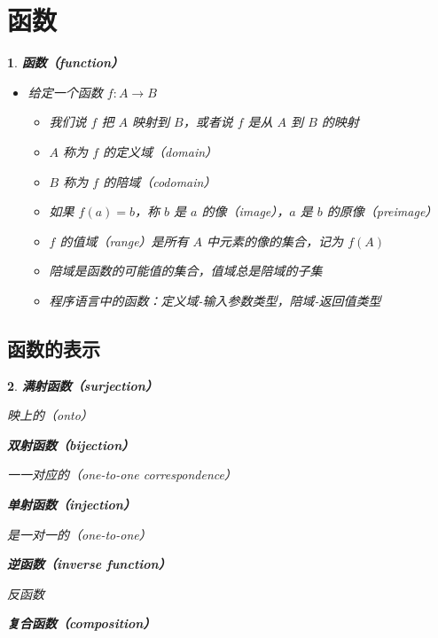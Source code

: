 \documentclass[UTF8]{report}
\theoremstyle{MyLineTheoremStyle} %
\theoremstyle{MyBlockTheoremStyle} %
\theoremstyle{MySubsubsectionStyle} %
\newtheorem{definition}{}
\begin{document}
\section{函数}

\begin{definition}
    \textbf{函数（function）}\par
    \begin{itemize}
        \item 给定一个函数 $f: A \to B$
        \begin{itemize}
            \item 我们说 $f$ 把 $A$ 映射到 $B$，或者说 $f$ 是从 $A$ 到 $B$ 的映射
            \item $A$ 称为 $f$ 的定义域（domain）
            \item $B$ 称为 $f$ 的陪域（codomain）
            \item 如果 $f(a) = b$，称 $b$ 是 $a$ 的像（image），$a$ 是 $b$ 的原像（preimage）
            \item $f$ 的值域（range）是所有 $A$ 中元素的像的集合，记为 $f(A)$
            \item 陪域是函数的可能值的集合，值域总是陪域的子集
            \item 程序语言中的函数：定义域-输入参数类型，陪域-返回值类型
        \end{itemize}
    \end{itemize}
\end{definition}

\subsection{函数的表示}

\begin{definition}
    \textbf{满射函数（surjection）}\par
    映上的（onto）\par

    \textbf{双射函数（bijection）}\par
    一一对应的（one-to-one correspondence）\par

    \textbf{单射函数（injection）}\par
    是一对一的（one-to-one）\par

    \textbf{逆函数（inverse function）}\par
    反函数\par

    \textbf{复合函数（composition）}\par
\end{definition}
\end{document}
